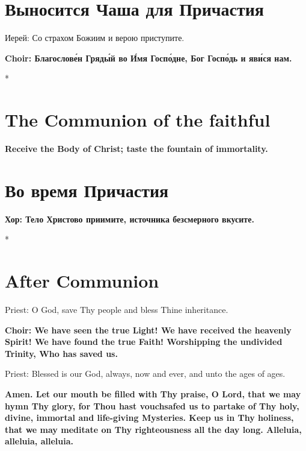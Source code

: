 \documentclass[12pt,a4paper,titlepage]{report}
\begin{document}
\begin{paracol}[1]{2}
	\switchcolumn[1]
	
	\section*{Выносится Чаша для Причастия}
	
	Иерей: Со страхом Божиим и верою приступите.

    \textbf{Choir: Благослове́н Гряды́й во И́мя Госпо́дне, Бог Госпо́дь и яви́ся нам.}
	
	\switchcolumn[0]*
	
    \section*{The Communion of the faithful}
 
    \textbf {Receive the Body of Christ; taste the fountain of immortality.}
	
	\switchcolumn[1]
	
	\section*{Во время Причастия}
	
	\textbf{Хор: Тело Христово приимите, источника безсмерного вкусите.}
	
	\switchcolumn[0]*
	
	\section*{After Communion}

    Priest: O God, save Thy people and bless Thine inheritance.

    \textbf {Choir: We have seen the true Light! We have received the heavenly Spirit! We have found the true Faith! Worshipping the undivided Trinity, Who has saved us.}

    Priest: Blessed is our God, always, now and ever, and unto the ages of ages.

    \textbf {Amen. Let our mouth be filled with Thy praise, O Lord, that we may hymn Thy glory, for Thou hast vouchsafed us to partake of Thy holy, divine, immortal and life-giving Mysteries. Keep us in Thy holiness, that we may meditate on Thy righteousness all the day long. Alleluia, alleluia, alleluia.}
	
	\switchcolumn[1]
	

\end{paracol}
\end{document}
